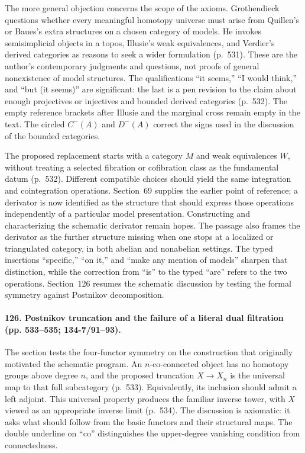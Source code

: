 The more general objection concerns the scope of the axioms. Grothendieck questions whether every meaningful homotopy universe must arise from Quillen's or Baues's extra structures on a chosen category of models. He invokes semisimplicial objects in a topos, Illusie's weak equivalences, and Verdier's derived categories as reasons to seek a wider formulation (p.~531). These are the author's contemporary judgments and questions, not proofs of general nonexistence of model structures. The qualifications ``it seems,'' ``I would think,'' and ``but (it seems)'' are significant: the last is a pen revision to the claim about enough projectives or injectives and bounded derived categories (p.~532). The empty reference brackets after Illusie and the marginal cross remain empty in the text. The circled $C^{-}(A)$ and $D^{-}(A)$ correct the signs used in the discussion of the bounded categories.

The proposed replacement starts with a category $M$ and weak equivalences $W$, without treating a selected fibration or cofibration class as the fundamental datum (p.~532). Different compatible choices should yield the same integration and cointegration operations. Section~69 supplies the earlier point of reference; a derivator is now identified as the structure that should express those operations independently of a particular model presentation. Constructing and characterizing the schematic derivator remain hopes. The passage also frames the derivator as the further structure missing when one stops at a localized or triangulated category, in both abelian and nonabelian settings. The typed insertions ``specific,'' ``on it,'' and ``make any mention of models'' sharpen that distinction, while the correction from ``is'' to the typed ``are'' refers to the two operations. Section~126 resumes the schematic discussion by testing the formal symmetry against Postnikov decomposition.

\paragraph{126. Postnikov truncation and the failure of a literal dual filtration (pp. 533--535; 134-7/91--93).}
The section tests the four-functor symmetry on the construction that originally motivated the schematic program. An $n$-co-connected object has no homotopy groups above degree $n$, and the proposed truncation $X\to X_n$ is the universal map to that full subcategory (p.~533). Equivalently, its inclusion should admit a left adjoint. This universal property produces the familiar inverse tower, with $X$ viewed as an appropriate inverse limit (p.~534). The discussion is axiomatic: it asks what should follow from the basic functors and their structural maps. The double underline on ``co'' distinguishes the upper-degree vanishing condition from connectedness.

